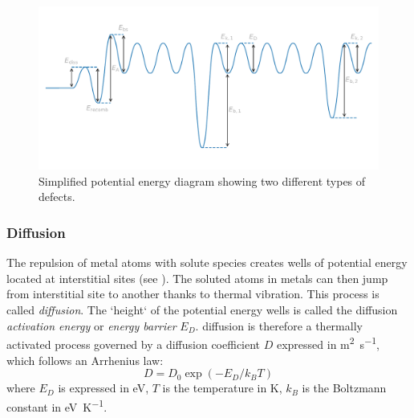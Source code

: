 \begin{figure} [h]
    \centering
    \includegraphics[width=\linewidth]{Figures/Chapter1/potential_energy_diagram.pdf}
    \caption{Simplified potential energy diagram showing two different types of defects.}
\end{figure}

\subsubsection{Diffusion}
The repulsion of metal atoms with solute species creates wells of potential energy located at interstitial sites (see ).
The soluted atoms in metals can then jump from interstitial site to another thanks to thermal vibration.
This process is called \emph{\gls{diffusion}}.
The `height` of the potential energy wells is called the \gls{diffusion} \textit{activation energy} or \textit{energy barrier} $E_D$.
\Gls{diffusion} is therefore a thermally activated process governed by a diffusion coefficient $D$ expressed in \si{m^2.s^{-1}}, which follows an Arrhenius law:
\begin{equation}
    D = D_0 \exp{(-E_D/k_B T)}
\end{equation}
where $E_D$ is expressed in \si{eV}, $T$ is the temperature in \si{K}, $k_B$ is the Boltzmann constant in \si{eV.K^{-1}}.

